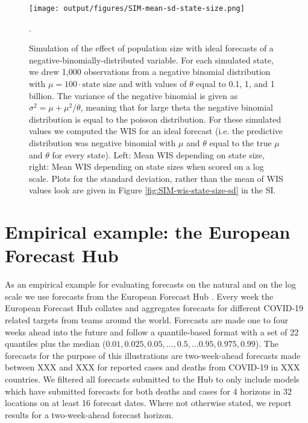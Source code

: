 \documentclass{article}
\begin{document}
\begin{figure}[h!]
    \centering
    \texttt{[image: output/figures/SIM-mean-sd-state-size.png]}
    \caption{Simulation of the effect of population size with ideal forecasts of a negative-binomially-distributed variable. For each simulated state, we drew 1,000 observations from a negative binomial distribution with $\mu = 100 \cdot \text{state size}$ and with values of $\theta$ equal to 0.1, 1, and 1 billion. The variance of the negative binomial is given as $\sigma^2 = \mu + \mu^2 / \theta$, meaning that for large theta the negative binomial distribution is equal to the poisson distribution. For these simulated values we computed the WIS for an ideal forecast (i.e. the predictive distribution was negative binomial with $\mu$ and $\theta$ equal to the true $\mu$ and $\theta$ for every state). Left: Mean WIS depending on state size, right: Mean WIS depending on state sizes when scored on a log scale. Plots for the standard deviation, rather than the mean of WIS values look are given in Figure \ref{fig:SIM-wis-state-size-sd} in the SI.}. 
    \label{fig:SIM-wis-state-size-mean}
\end{figure}




\section{Empirical example: the European Forecast Hub}

As an empirical example for evaluating forecasts on the natural and on the log scale we use forecasts from the European Forecast Hub \citep{europeancovid-19forecasthubEuropeanCovid19Forecast2021, sherrattPredictivePerformanceMultimodel2022}. Every week the European Forecast Hub collates and aggregates forecasts for different COVID-19 related targets from teams around the world. Forecasts are made one to four weeks ahead into the future and follow a quantile-based format with a set of 22 quantiles plus the median ($0.01, 0.025, 0.05, ..., 0.5, ... 0.95, 0.975, 0.99$). The forecasts for the purpose of this illustrations are two-week-ahead forecasts made between XXX and XXX for reported cases and deaths from COVID-19 in XXX countries. We filtered all forecasts submitted to the Hub to only include models which have submitted forecasts for both deaths and cases for 4 horizons in 32 locations on at least 16 forecast dates. Where not otherwise stated, we report results for a two-week-ahead forecast horizon. 
\end{document}
